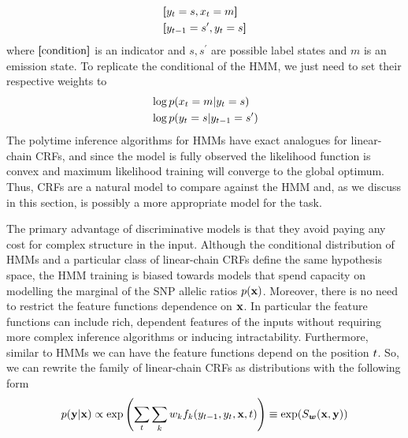 \begin{align*}
&\bm{[}y_{t} = s, x_{t} = m\bm{]}\\
&\bm{[}y_{t-1} = s^{\prime} , y_{t} = s\bm{]}
\end{align*}
where $\bm{[}\text{condition}\bm{]}$ is an indicator and $s,s^{\prime}$ are possible label states and $m$ is an emission state. To replicate the conditional of the HMM, we just need to set their respective weights to
\begin{align*}
&\log p(x_{t} = m | y_{t} = s)\\
&\log p( y_{t} = s | y_{t-1} = s^{\prime})
\end{align*}
The polytime inference algorithms for HMMs have exact analogues for linear-chain CRFs, and since the model is fully observed the likelihood function is convex and maximum likelihood training will converge to the global optimum. Thus, CRFs are a natural model to compare against the HMM and, as we discuss in this section, is possibly a more appropriate model for the task.

The primary advantage of discriminative models is that they avoid paying any cost for complex structure in the input. Although the conditional distribution of HMMs and a particular class of linear-chain CRFs define the same hypothesis space, the HMM training is biased towards models that spend capacity on modelling the marginal of the SNP allelic ratios $p(\mathbf{x})$. Moreover, there is no need to restrict the feature functions dependence on $\mathbf{x}$. In particular the feature functions can include rich, dependent features of the inputs without requiring more complex inference algorithms or inducing intractability. Furthermore, similar to HMMs we can have the feature functions depend on the position $t$. So, we can rewrite the family of linear-chain CRFs as distributions with the following form
\begin{align*}
p(\mathbf{y} | \mathbf{x}) \propto \exp\left( \sum_{t} \sum_{k} w_k f_{k}(y_{t-1}, y_{t}, \mathbf{x}, t)\right) \equiv \exp(S_{\bm{w}}(\mathbf{x}, \mathbf{y}))
\end{align*}

